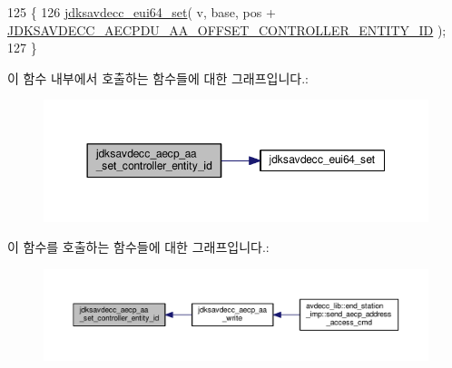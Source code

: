 \begin{DoxyCode}
125 \{
126     \hyperlink{group__eui64_ga1c5b342315464ff77cbc7d587765432d}{jdksavdecc\_eui64\_set}( v, base, pos + 
      \hyperlink{group___a_e_c_p___a_a__offsets_gaf07089779823c7d311361b667b1abd6b}{JDKSAVDECC\_AECPDU\_AA\_OFFSET\_CONTROLLER\_ENTITY\_ID} );
127 \}
\end{DoxyCode}


이 함수 내부에서 호출하는 함수들에 대한 그래프입니다.\+:
\nopagebreak
\begin{figure}[H]
\begin{center}
\leavevmode
\includegraphics[width=350pt]{group___a_e_c_p___a_a_ga16a3ac69955243c9eee453d51b6dc28a_cgraph}
\end{center}
\end{figure}




이 함수를 호출하는 함수들에 대한 그래프입니다.\+:
\nopagebreak
\begin{figure}[H]
\begin{center}
\leavevmode
\includegraphics[width=350pt]{group___a_e_c_p___a_a_ga16a3ac69955243c9eee453d51b6dc28a_icgraph}
\end{center}
\end{figure}


